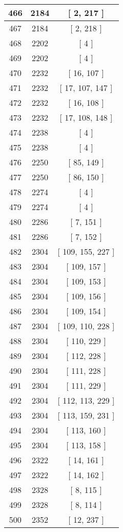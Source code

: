 \begin{center}
\begin{longtable}[H]{|| c c c ||}
\hline
466 & 2184 & [ 2, 217 ] \\ 
\hline
467 & 2184 & [ 2, 218 ] \\ 
\hline
468 & 2202 & [ 4 ] \\ 
\hline
469 & 2202 & [ 4 ] \\ 
\hline
470 & 2232 & [ 16, 107 ] \\ 
\hline
471 & 2232 & [ 17, 107, 147 ] \\ 
\hline
472 & 2232 & [ 16, 108 ] \\ 
\hline
473 & 2232 & [ 17, 108, 148 ] \\ 
\hline
474 & 2238 & [ 4 ] \\ 
\hline
475 & 2238 & [ 4 ] \\ 
\hline
476 & 2250 & [ 85, 149 ] \\ 
\hline
477 & 2250 & [ 86, 150 ] \\ 
\hline
478 & 2274 & [ 4 ] \\ 
\hline
479 & 2274 & [ 4 ] \\ 
\hline
480 & 2286 & [ 7, 151 ] \\ 
\hline
481 & 2286 & [ 7, 152 ] \\ 
\hline
482 & 2304 & [ 109, 155, 227 ] \\ 
\hline
483 & 2304 & [ 109, 157 ] \\ 
\hline
484 & 2304 & [ 109, 153 ] \\ 
\hline
485 & 2304 & [ 109, 156 ] \\ 
\hline
486 & 2304 & [ 109, 154 ] \\ 
\hline
487 & 2304 & [ 109, 110, 228 ] \\ 
\hline
488 & 2304 & [ 110, 229 ] \\ 
\hline
489 & 2304 & [ 112, 228 ] \\ 
\hline
490 & 2304 & [ 111, 228 ] \\ 
\hline
491 & 2304 & [ 111, 229 ] \\ 
\hline
492 & 2304 & [ 112, 113, 229 ] \\ 
\hline
493 & 2304 & [ 113, 159, 231 ] \\ 
\hline
494 & 2304 & [ 113, 160 ] \\ 
\hline
495 & 2304 & [ 113, 158 ] \\ 
\hline
496 & 2322 & [ 14, 161 ] \\ 
\hline
497 & 2322 & [ 14, 162 ] \\ 
\hline
498 & 2328 & [ 8, 115 ] \\ 
\hline
499 & 2328 & [ 8, 114 ] \\ 
\hline
500 & 2352 & [ 12, 237 ] \\ 

\end{longtable}
\end{center}
